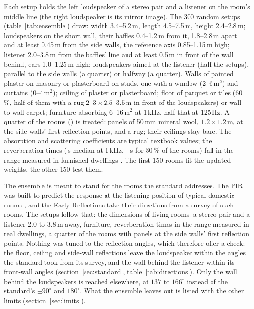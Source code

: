 \documentclass[11pt,a4paper]{article}
\begin{document}
Each setup holds the left loudspeaker of a stereo pair and a listener on the room's middle line
(the right loudspeaker is its mirror image). The 300 random setups (table~\ref{tab:ensemble}) draw:
width 3.4--5.2\,m, length 4.5--7.5\,m, height 2.4--2.8\,m; loudspeakers on the short wall, their baffles
0.4--1.2\,m from it, 1.8--2.8\,m apart and at least 0.45\,m from the side walls, the reference axis
0.85--1.15\,m high; listener 2.0--3.8\,m from the baffles' line and at least 0.5\,m in front of the wall
behind, ears 1.0--1.25\,m high; loudspeakers aimed at the listener (half the setups), parallel to the
side walls (a quarter) or halfway (a quarter). Walls of painted plaster on masonry or plasterboard on
studs, one with a window (2--6\,m$^2$) and curtains (0--4\,m$^2$); ceiling of plaster or plasterboard;
floor of parquet or tiles (60\,\%, half of them with a rug $2$--$3 \times 2.5$--$3.5$\,m in front of the
loudspeakers) or wall-to-wall carpet; furniture absorbing 6--16\,m$^2$ at 1\,kHz, half that at
125\,Hz. A quarter of the rooms (\ntreated) is treated: panels of 50\,mm mineral wool, $1.2 \times
1.2$\,m, at the side walls' first reflection points, and a rug; their ceilings stay bare. The
absorption and scattering coefficients are typical textbook values; the reverberation times
(\nrtMedian\,s median at 1\,kHz, \nrtLo--\nrtHi\,s for 80\,\% of the rooms) fall in the range measured in
furnished dwellings \cite{diaz2005}. The first 150 rooms fit the updated weights, the other 150 test
them.

The ensemble is meant to stand for the rooms the standard addresses. The PIR was built to predict the
response at the listening position of typical domestic rooms \cite{devantier2002}, and the Early
Reflections take their directions from a survey of such rooms. The setups follow that: the dimensions
of living rooms, a stereo pair and a listener 2.0 to 3.8\,m away, furniture, reverberation times in the
range measured in real dwellings, a quarter of the rooms with panels at the side walls' first
reflection points. Nothing was tuned to the reflection angles, which therefore offer a check: the floor,
ceiling and side-wall reflections leave the loudspeaker within the angles the standard took from its survey, and the
wall behind the listener within its front-wall angles (section~\ref{sec:standard},
table~\ref{tab:directions}). Only the wall behind the loudspeakers is reached elsewhere, at $137$ to
$166^\circ$ instead of the standard's $\pm90^\circ$ and $180^\circ$. What the ensemble leaves out is
listed with the other limits (section~\ref{sec:limits}).
\end{document}

